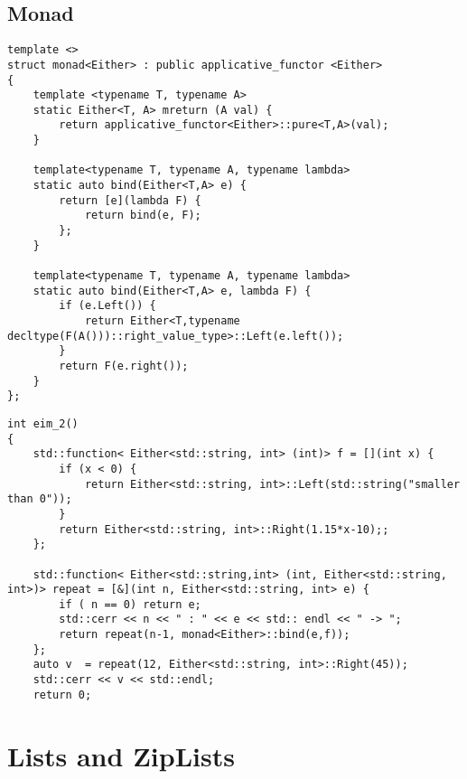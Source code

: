 \documentclass[12pt,fleqn]{article}
\begin{document}
\subsection{Monad}
%

%
%
%
\begin{minipage}{\linewidth}
\begin{lstlisting}[caption=Either monad,label=eithermonad]
template <>
struct monad<Either> : public applicative_functor <Either>
{
	template <typename T, typename A> 
	static Either<T, A> mreturn (A val) {
		return applicative_functor<Either>::pure<T,A>(val);
	}
	
	template<typename T, typename A, typename lambda>
	static auto bind(Either<T,A> e) {
		return [e](lambda F) {
			return bind(e, F);
		};
	}

	template<typename T, typename A, typename lambda> 
	static auto bind(Either<T,A> e, lambda F) {
		if (e.Left()) {
			return Either<T,typename decltype(F(A()))::right_value_type>::Left(e.left());
		}
		return F(e.right());
	}
};
\end{lstlisting}
\end{minipage}
%
%
%



%
%
\begin{minipage}{\linewidth}
\begin{lstlisting}[caption=Example of the Either monad,label=eithermonadexamp]
int eim_2()
{
	std::function< Either<std::string, int> (int)> f = [](int x) {
		if (x < 0) {
			return Either<std::string, int>::Left(std::string("smaller than 0"));
		}
		return Either<std::string, int>::Right(1.15*x-10);;
	};

	std::function< Either<std::string,int> (int, Either<std::string, int>)> repeat = [&](int n, Either<std::string, int> e) {
		if ( n == 0) return e;
		std::cerr << n << " : " << e << std:: endl << " -> ";
		return repeat(n-1, monad<Either>::bind(e,f));
	}; 
	auto v  = repeat(12, Either<std::string, int>::Right(45));
	std::cerr << v << std::endl;
	return 0;
\end{lstlisting}
\end{minipage}
%
%
%


\section{Lists and ZipLists}
%
%
\end{document}
